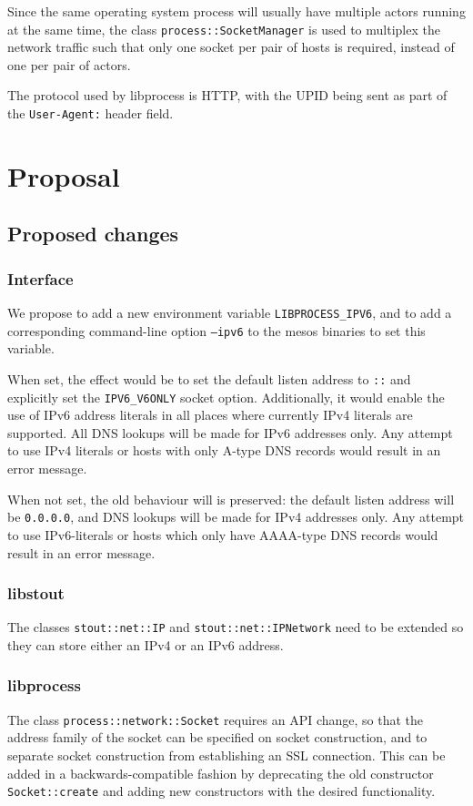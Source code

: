 \documentclass{scrreprt}
\begin{document}
Since the same operating system process will usually have multiple
actors running at the same time, the class \texttt{process::SocketManager}
is used to multiplex the network traffic such that only one socket per pair of hosts
is required, instead of one per pair of actors.

The protocol used by libprocess is HTTP, with the UPID being sent as part of
the \texttt{User-Agent:} header field.



\chapter{Proposal}

\section{Proposed changes}
\subsection{Interface}
We propose to add a new environment variable \texttt{LIBPROCESS\_IPV6},
and to add a corresponding command-line option \texttt{--ipv6} to the mesos binaries
to set this variable.

When set, the effect would be to set the default listen address to \texttt{::}
and explicitly set the \texttt{IPV6\_V6ONLY} socket option.
Additionally, it would enable the use of IPv6 address literals in all
places where currently IPv4 literals are supported.
All DNS lookups will be made for IPv6 addresses only.
Any attempt to use IPv4 literals or hosts with only A-type DNS records
would result in an error message.

When not set, the old behaviour will is preserved: the default listen address will
be \texttt{0.0.0.0}, and DNS lookups will be made for IPv4 addresses only.
Any attempt to use IPv6-literals or hosts which only have AAAA-type DNS records would
result in an error message.


\subsection{libstout}
The classes \texttt{stout::net::IP} and \texttt{stout::net::IPNetwork} need to
be extended so they can store either an IPv4 or an IPv6 address.


\subsection{libprocess}
The class \texttt{process::network::Socket} requires an API change, so that the
address family of the socket can be specified on socket construction, and to
separate socket construction from establishing an SSL connection.
This can be added in a backwards-compatible fashion by deprecating the old
constructor \texttt{Socket::create} and adding new constructors with the desired
functionality.
\end{document}
